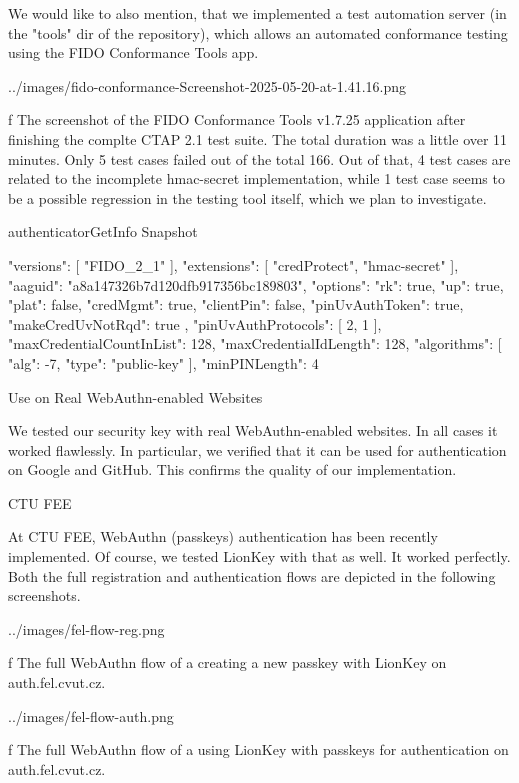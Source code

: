 We would like to also mention, that we implemented a test automation server (in the "tools" dir of the repository), which allows an automated conformance testing using the FIDO Conformance Tools app.

\midinsert
{}
\picw=144mm \cinspic ../images/fido-conformance-Screenshot-2025-05-20-at-1.41.16.png
\caption/f The screenshot of the FIDO Conformance Tools v1.7.25 application after finishing the complte CTAP 2.1 test suite. The total duration was a little over 11 minutes. Only 5 test cases failed out of the total 166. Out of that, 4 test cases are related to the incomplete hmac-secret implementation, while 1 test case seems to be a possible regression in the testing tool itself, which we plan to investigate.
\endinsert

\secc authenticatorGetInfo Snapshot

\begtt
{
	"versions": [
		"FIDO_2_1"
	],
	"extensions": [
		"credProtect",
		"hmac-secret"
	],
	"aaguid": "a8a147326b7d120dfb917356bc189803",
	"options": {
		"rk": true,
		"up": true,
		"plat": false,
		"credMgmt": true,
		"clientPin": false,
		"pinUvAuthToken": true,
		"makeCredUvNotRqd": true
	},
	"pinUvAuthProtocols": [
		2,
		1
	],
	"maxCredentialCountInList": 128,
	"maxCredentialIdLength": 128,
	"algorithms": [
		{
			"alg": -7,
			"type": "public-key"
		}
	],
	"minPINLength": 4
}
\endtt


\sec Use on Real WebAuthn-enabled Websites

We tested our security key with real WebAuthn-enabled websites. In all cases it worked flawlessly. In particular, we verified that it can be used for authentication on Google and GitHub. This confirms the quality of our implementation.

\secc CTU FEE

At CTU FEE, WebAuthn (passkeys) authentication has been recently implemented. Of course, we tested LionKey with that as well. It worked perfectly. Both the full registration and authentication flows are depicted in the following screenshots.

\midinsert
{}
\picw=144mm \cinspic ../images/fel-flow-reg.png
\caption/f The full WebAuthn flow of a creating a new passkey with LionKey on auth.fel.cvut.cz.
\endinsert


\midinsert
{}
\picw=144mm \cinspic ../images/fel-flow-auth.png
\caption/f The full WebAuthn flow of a using LionKey with passkeys for authentication on auth.fel.cvut.cz.
\endinsert
